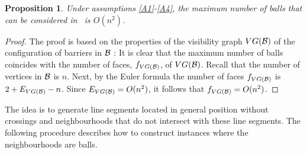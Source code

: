 \documentclass[a4paper,  review, authoryear, 1p.]{elsarticle}
\newcommand{\TSPHN}{{\sf{H-TSPHN}\xspace }}
\newtheorem{prop}{Proposition}
\newcommand{\JP}[1]{{\color{armygreen}#1}}
\newcommand{\CV}[1]{{\color{red}#1}}
\begin{document}
	
	
	\begin{prop}
		Under assumptions \ref{A1}-\ref{A4}, the maximum number of balls that can be considered in \TSPHN \ is $O(n^2)$.
	\end{prop}
	\begin{proof}
		The proof is based on the properties of the visibility graph $VG(\cal B)$ of the configuration of barriers in $\cal B$ \citep{mitchell_shortest_2017}:  It is clear that the maximum number of balls coincides with the number of faces, $f_{VG(\cal B)}$, of $VG(\cal B)$.  Recall that the number of vertices in $\cal B$ is $n$. Next, by the Euler formula the number of faces $f_{VG(\cal B)}$ is $2+E_{VG(\cal B)}-n$. Since $E_{VG(\cal B)}=O(n^2)$, it follows that $f_{VG(\cal B)}=O(n^2)$.
	\end{proof}
	
	
	The idea is to generate line segments located in general position without crossings and neighbourhoods that do not intersect with these line segments. The following procedure describes how to construct instances where the neighbourhoods are balls.
	
\end{document}
